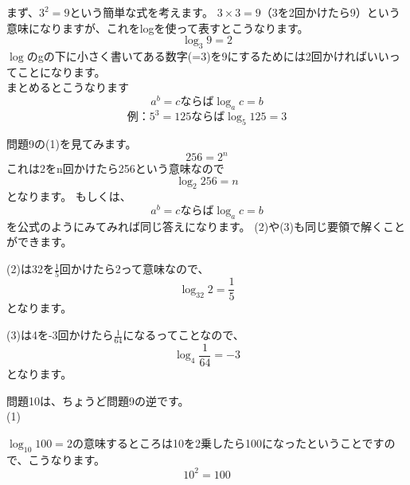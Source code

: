 \documentclass{jsarticle}
\begin{document}
まず、$3^2=9$という簡単な式を考えます。
$3 \times 3=9$（3を2回かけたら9）という意味になりますが、これをlogを使って表すとこうなります。
\[\log_3 9=2\]
$\log$のgの下に小さく書いてある数字(=3)を9にするためには2回かければいいってことになります。\\

まとめるとこうなります\\
\[a^b=c ならば \log_a c=b\]
\[例：5^3=125 ならば \log_5 125=3\]
\hrulefill

問題9の(1)を見てみます。\\
\[256=2^n\]
これは2をn回かけたら256という意味なので
\[\log_2 256=n\]
となります。
もしくは、\[a^b=c ならば \log_a c=b\]を公式のようにみてみれば同じ答えになります。
(2)や(3)も同じ要領で解くことができます。\\
\dotfill

(2)は32を$\frac{1}{5}$回かけたら2って意味なので、
\[\log_32 2=\frac{1}{5}\]となります。\\
\dotfill

(3)は4を-3回かけたら$\frac{1}{64}$になるってことなので、
\[\log_4 \frac{1}{64}=-3\]となります。\\
\hrulefill

問題10は、ちょうど問題9の逆です。\\
(1)\par
$\log_10 100=2$の意味するところは10を2乗したら100になったということですので、こうなります。\\
\[10^2=100\]
\dotfill
\end{document}

